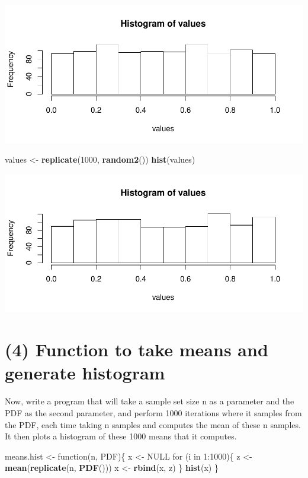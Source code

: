 \documentclass[]{article}
\newenvironment{Shaded}{\begin{snugshade}}{\end{snugshade}}
\newcommand{\KeywordTok}[1]{\textcolor[rgb]{0.13,0.29,0.53}{\textbf{{#1}}}}
\newcommand{\DecValTok}[1]{\textcolor[rgb]{0.00,0.00,0.81}{{#1}}}
\newcommand{\StringTok}[1]{\textcolor[rgb]{0.31,0.60,0.02}{{#1}}}
\newcommand{\OtherTok}[1]{\textcolor[rgb]{0.56,0.35,0.01}{{#1}}}
\newcommand{\NormalTok}[1]{{#1}}
\begin{document}
\includegraphics{CHunt_Assign9_PS1_PS2_files/figure-latex/unnamed-chunk-3-1.pdf}

\begin{Shaded}
\begin{Highlighting}[]
\NormalTok{values <-}\StringTok{ }\KeywordTok{replicate}\NormalTok{(}\DecValTok{1000}\NormalTok{, }\KeywordTok{random2}\NormalTok{())}
\KeywordTok{hist}\NormalTok{(values)}
\end{Highlighting}
\end{Shaded}

\includegraphics{CHunt_Assign9_PS1_PS2_files/figure-latex/unnamed-chunk-4-1.pdf}

\section{(4) Function to take means and generate
histogram}\label{function-to-take-means-and-generate-histogram}

Now, write a program that will take a sample set size n as a parameter
and the PDF as the second parameter, and perform 1000 iterations where
it samples from the PDF, each time taking n samples and computes the
mean of these n samples. It then plots a histogram of these 1000 means
that it computes.

\begin{Shaded}
\begin{Highlighting}[]
\NormalTok{means.hist <-}\StringTok{ }\NormalTok{function(n, PDF)\{}
          \NormalTok{x <-}\StringTok{ }\OtherTok{NULL}
          \NormalTok{for (i in }\DecValTok{1}\NormalTok{:}\DecValTok{1000}\NormalTok{)\{}
           \NormalTok{z <-}\StringTok{ }\KeywordTok{mean}\NormalTok{(}\KeywordTok{replicate}\NormalTok{(n, }\KeywordTok{PDF}\NormalTok{()))}
           \NormalTok{x <-}\StringTok{ }\KeywordTok{rbind}\NormalTok{(x, z)}
          \NormalTok{\}}
          \KeywordTok{hist}\NormalTok{(x)}
\NormalTok{\}}
\end{Highlighting}
\end{Shaded}
\end{document}
